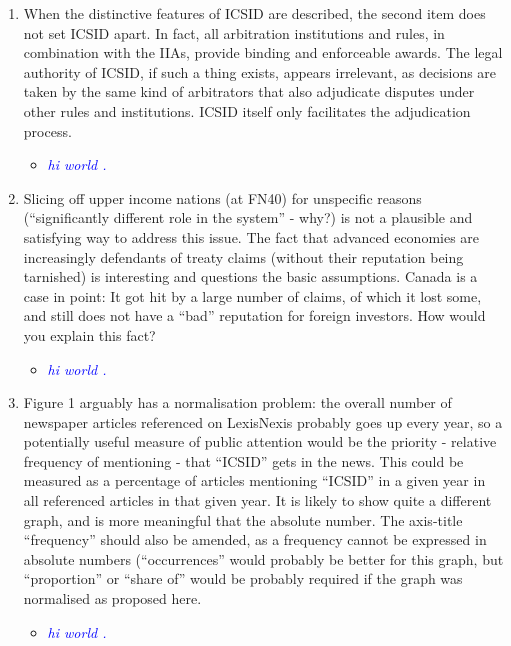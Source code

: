 \begin{enumerate}
	\item When the distinctive features of ICSID are described, the second item does not set ICSID apart. In fact, all arbitration institutions and rules, in combination with the IIAs, provide binding and enforceable awards. The legal authority of ICSID, if such a thing exists, appears irrelevant, as decisions are taken by the same kind of arbitrators that also adjudicate disputes under other rules and institutions. ICSID itself only facilitates the adjudication process. 
	\begin{itemize}
		\item \textcolor{blue}{ \emph{ hi world . }}
	\end{itemize}
	\item Slicing off upper income nations (at FN40) for unspecific reasons (``significantly different role in the system'' - why?) is not a plausible and satisfying way to address this issue. The fact that advanced economies are increasingly defendants of treaty claims (without their reputation being tarnished) is interesting and questions the basic assumptions. Canada is a case in point: It got hit by a large number of claims, of which it lost some, and still does not have a ``bad'' reputation for foreign investors. How would you explain this fact?	
	\begin{itemize}
		\item \textcolor{blue}{ \emph{ hi world . }}
	\end{itemize}
	\item Figure 1 arguably has a normalisation problem: the overall number of newspaper articles referenced on LexisNexis probably goes up every year, so a potentially useful measure of public attention would be the priority - relative frequency of mentioning - that ``ICSID'' gets in the news. This could be measured as a percentage of articles mentioning ``ICSID'' in a given year in all referenced articles in that given year. It is likely to show quite a different graph, and is more meaningful that the absolute number. The axis-title ``frequency'' should also be amended, as a frequency cannot be expressed in absolute numbers (``occurrences'' would probably be better for this graph, but ``proportion'' or ``share of'' would be probably required if the graph was normalised as proposed here. 	
	\begin{itemize}
		\item \textcolor{blue}{ \emph{ hi world . }}
	\end{itemize}

\end{enumerate}
